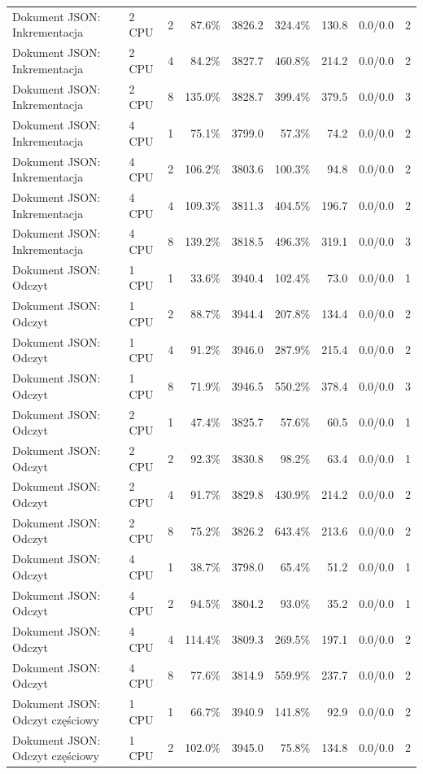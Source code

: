 \begin{table}[ht]
{\begin{tabular}{llcrrrrcc}
Dokument JSON: Inkrementacja & 2 CPU & 2 & 87.6\% & 3826.2 & 324.4\% & 130.8 & 0.0/0.0 & 2 \\
Dokument JSON: Inkrementacja & 2 CPU & 4 & 84.2\% & 3827.7 & 460.8\% & 214.2 & 0.0/0.0 & 2 \\
Dokument JSON: Inkrementacja & 2 CPU & 8 & 135.0\% & 3828.7 & 399.4\% & 379.5 & 0.0/0.0 & 3 \\
Dokument JSON: Inkrementacja & 4 CPU & 1 & 75.1\% & 3799.0 & 57.3\% & 74.2 & 0.0/0.0 & 2 \\
Dokument JSON: Inkrementacja & 4 CPU & 2 & 106.2\% & 3803.6 & 100.3\% & 94.8 & 0.0/0.0 & 2 \\
Dokument JSON: Inkrementacja & 4 CPU & 4 & 109.3\% & 3811.3 & 404.5\% & 196.7 & 0.0/0.0 & 2 \\
Dokument JSON: Inkrementacja & 4 CPU & 8 & 139.2\% & 3818.5 & 496.3\% & 319.1 & 0.0/0.0 & 3 \\
Dokument JSON: Odczyt & 1 CPU & 1 & 33.6\% & 3940.4 & 102.4\% & 73.0 & 0.0/0.0 & 1 \\
Dokument JSON: Odczyt & 1 CPU & 2 & 88.7\% & 3944.4 & 207.8\% & 134.4 & 0.0/0.0 & 2 \\
Dokument JSON: Odczyt & 1 CPU & 4 & 91.2\% & 3946.0 & 287.9\% & 215.4 & 0.0/0.0 & 2 \\
Dokument JSON: Odczyt & 1 CPU & 8 & 71.9\% & 3946.5 & 550.2\% & 378.4 & 0.0/0.0 & 3 \\
Dokument JSON: Odczyt & 2 CPU & 1 & 47.4\% & 3825.7 & 57.6\% & 60.5 & 0.0/0.0 & 1 \\
Dokument JSON: Odczyt & 2 CPU & 2 & 92.3\% & 3830.8 & 98.2\% & 63.4 & 0.0/0.0 & 1 \\
Dokument JSON: Odczyt & 2 CPU & 4 & 91.7\% & 3829.8 & 430.9\% & 214.2 & 0.0/0.0 & 2 \\
Dokument JSON: Odczyt & 2 CPU & 8 & 75.2\% & 3826.2 & 643.4\% & 213.6 & 0.0/0.0 & 2 \\
Dokument JSON: Odczyt & 4 CPU & 1 & 38.7\% & 3798.0 & 65.4\% & 51.2 & 0.0/0.0 & 1 \\
Dokument JSON: Odczyt & 4 CPU & 2 & 94.5\% & 3804.2 & 93.0\% & 35.2 & 0.0/0.0 & 1 \\
Dokument JSON: Odczyt & 4 CPU & 4 & 114.4\% & 3809.3 & 269.5\% & 197.1 & 0.0/0.0 & 2 \\
Dokument JSON: Odczyt & 4 CPU & 8 & 77.6\% & 3814.9 & 559.9\% & 237.7 & 0.0/0.0 & 2 \\
Dokument JSON: Odczyt częściowy & 1 CPU & 1 & 66.7\% & 3940.9 & 141.8\% & 92.9 & 0.0/0.0 & 2 \\
Dokument JSON: Odczyt częściowy & 1 CPU & 2 & 102.0\% & 3945.0 & 75.8\% & 134.8 & 0.0/0.0 & 2 \\

\end{tabular}}
\end{table}
